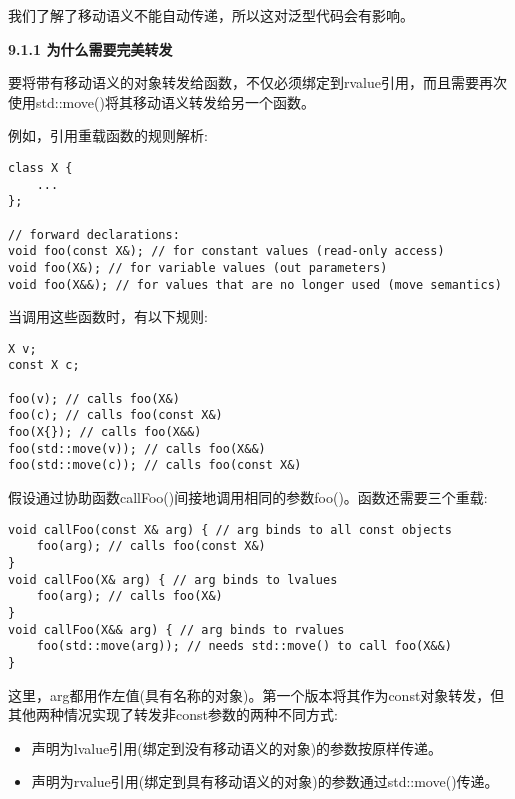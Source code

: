 我们了解了移动语义不能自动传递，所以这对泛型代码会有影响。\par

\hspace*{\fill} \par %
\textbf{9.1.1 为什么需要完美转发}

要将带有移动语义的对象转发给函数，不仅必须绑定到rvalue引用，而且需要再次使用std::move()将其移动语义转发给另一个函数。\par

例如，引用重载函数的规则解析:\par

\begin{lstlisting}[caption={}]
class X {
	...
};

// forward declarations:
void foo(const X&); // for constant values (read-only access)
void foo(X&); // for variable values (out parameters)
void foo(X&&); // for values that are no longer used (move semantics)
\end{lstlisting}

当调用这些函数时，有以下规则:\par

\begin{lstlisting}[caption={}]
X v;
const X c;

foo(v); // calls foo(X&)
foo(c); // calls foo(const X&)
foo(X{}); // calls foo(X&&)
foo(std::move(v)); // calls foo(X&&)
foo(std::move(c)); // calls foo(const X&)
\end{lstlisting}

假设通过协助函数callFoo()间接地调用相同的参数foo()。函数还需要三个重载:\par

\begin{lstlisting}[caption={}]
void callFoo(const X& arg) { // arg binds to all const objects
	foo(arg); // calls foo(const X&)
}
void callFoo(X& arg) { // arg binds to lvalues
	foo(arg); // calls foo(X&)
}
void callFoo(X&& arg) { // arg binds to rvalues
	foo(std::move(arg)); // needs std::move() to call foo(X&&)
}
\end{lstlisting}

这里，arg都用作左值(具有名称的对象)。第一个版本将其作为const对象转发，但其他两种情况实现了转发非const参数的两种不同方式:\par

\begin{itemize}
	\item 声明为lvalue引用(绑定到没有移动语义的对象)的参数按原样传递。
	\item 声明为rvalue引用(绑定到具有移动语义的对象)的参数通过std::move()传递。
\end{itemize}

